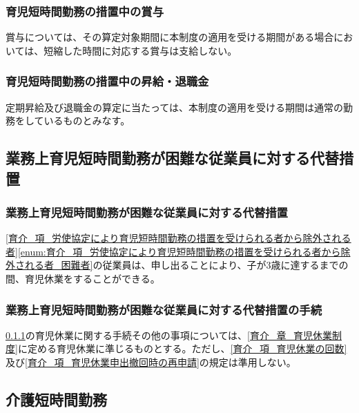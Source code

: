 \documentclass{jsarticle}
\begin{document}
\subsubsection{育児短時間勤務の措置中の賞与}
\label{育介_項_育児短時間勤務の措置中の賞与}
賞与については、その算定対象期間に本制度の適用を受ける期間がある場合においては、短縮した時間に対応する賞与は支給しない。

\subsubsection{育児短時間勤務の措置中の昇給・退職金}
\label{育介_項_育児短時間勤務の措置中の昇給・退職金}
定期昇給及び退職金の算定に当たっては、本制度の適用を受ける期間は通常の勤務をしているものとみなす。

\subsection{業務上育児短時間勤務が困難な従業員に対する代替措置}
\label{育介_条_業務上育児短時間勤務が困難な従業員に対する代替措置}

\subsubsection{業務上育児短時間勤務が困難な従業員に対する代替措置}
\label{育介_項_業務上育児短時間勤務が困難な従業員に対する代替措置}
\ref{育介_項_労使協定により育児短時間勤務の措置を受けられる者から除外される者}\ref{enum:育介_項_労使協定により育児短時間勤務の措置を受けられる者から除外される者_困難者}の従業員は、申し出ることにより、子が3歳に達するまでの間、育児休業をすることができる。

\subsubsection{業務上育児短時間勤務が困難な従業員に対する代替措置の手続}
\label{育介_項_業務上育児短時間勤務が困難な従業員に対する代替措置の手続}
\ref{育介_項_業務上育児短時間勤務が困難な従業員に対する代替措置}の育児休業に関する手続その他の事項については、\ref{育介_章_育児休業制度}に定める育児休業に準じるものとする。ただし、\ref{育介_項_育児休業の回数}及び\ref{育介_項_育児休業申出撤回時の再申請}の規定は準用しない。

\subsection{介護短時間勤務}
\label{育介_条_介護短時間勤務}
\end{document}
